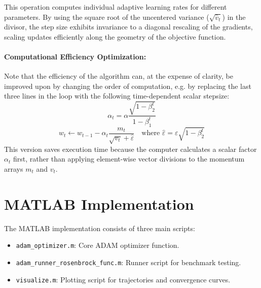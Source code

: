 \documentclass[11pt,a4paper]{article}
\begin{document}
\noindent This operation computes individual adaptive learning rates for different parameters. By using the square root of the uncentered variance ($\sqrt{\hat{v}_t}$) in the divisor, the step size exhibits invariance to a diagonal rescaling of the gradients, scaling updates efficiently along the geometry of the objective function.

\paragraph{Computational Efficiency Optimization:}
Note that the efficiency of the algorithm can, at the expense of clarity, be improved upon by changing the order of computation, e.g. by replacing the last three lines in the loop with the following time-dependent scalar stepsize:
\begin{equation}
    \alpha_t = \alpha \frac{\sqrt{1 - \beta_2^t}}{1 - \beta_1^t}
\end{equation}
\begin{equation}
    w_t \leftarrow w_{t-1} - \alpha_t \frac{m_t}{\sqrt{v_t} + \hat{\varepsilon}} \quad \text{where } \hat{\varepsilon} = \varepsilon \sqrt{1 - \beta_2^t}
\end{equation}
This version saves execution time because the computer calculates a scalar factor $\alpha_t$ first, rather than applying element-wise vector divisions to the momentum arrays $m_t$ and $v_t$.

\section{MATLAB Implementation}

The MATLAB implementation consists of three main scripts:
\begin{itemize}
    \item \texttt{adam\_optimizer.m}: Core ADAM optimizer function.
    \item \texttt{adam\_runner\_rosenbrock\_func.m}: Runner script for benchmark testing.
    \item \texttt{visualize.m}: Plotting script for trajectories and convergence curves.
\end{itemize}
\end{document}
